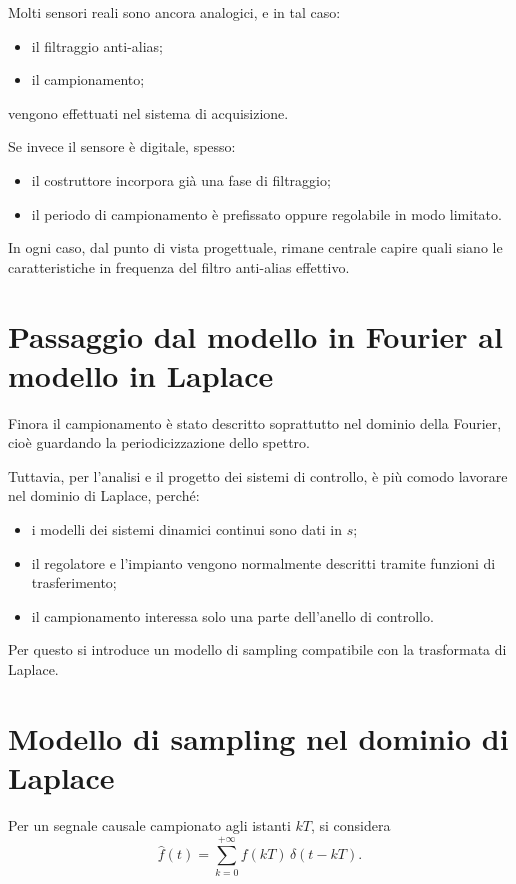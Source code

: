 Molti sensori reali sono ancora analogici, e in tal caso:
\begin{itemize}
    \item il filtraggio anti-alias;
    \item il campionamento;
\end{itemize}
vengono effettuati nel sistema di acquisizione.

Se invece il sensore è digitale, spesso:
\begin{itemize}
    \item il costruttore incorpora già una fase di filtraggio;
    \item il periodo di campionamento è prefissato oppure regolabile in modo limitato.
\end{itemize}

In ogni caso, dal punto di vista progettuale, rimane centrale capire quali siano
le caratteristiche in frequenza del filtro anti-alias effettivo.

\section{Passaggio dal modello in Fourier al modello in Laplace}

Finora il campionamento è stato descritto soprattutto nel dominio della Fourier,
cioè guardando la periodicizzazione dello spettro.

Tuttavia, per l'analisi e il progetto dei sistemi di controllo, è più comodo lavorare
nel dominio di Laplace, perché:
\begin{itemize}
    \item i modelli dei sistemi dinamici continui sono dati in \(s\);
    \item il regolatore e l'impianto vengono normalmente descritti tramite
    funzioni di trasferimento;
    \item il campionamento interessa solo una parte dell'anello di controllo.
\end{itemize}

Per questo si introduce un modello di sampling compatibile con la trasformata di Laplace.

\section{Modello di sampling nel dominio di Laplace}

Per un segnale causale campionato agli istanti \(kT\), si considera
\[
\hat f(t)=\sum_{k=0}^{+\infty} f(kT)\,\delta(t-kT).
\]

